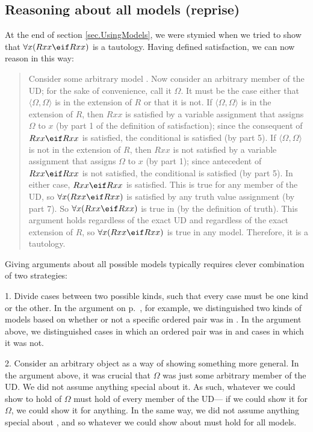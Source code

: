 \subsection{Reasoning about all models (reprise)}
At the end of section \ref{sec.UsingModels}, we were stymied when we tried to show that $\forall x(Rxx\eif Rxx)$ is a tautology. Having defined satisfaction, we can now reason in this way:
\begin{quote}
Consider some arbitrary model . Now consider an arbitrary member of the UD; for the sake of convenience, call it $\Omega$. It must be the case either that $\langle\Omega,\Omega\rangle$ is in the extension of $R$ or that it is not. If $\langle\Omega,\Omega\rangle$ is in the extension of $R$, then $Rxx$ is satisfied by a variable assignment that assigns $\Omega$ to $x$ (by part 1 of the definition of  {satisfaction}); since the consequent of $Rxx\eif Rxx$ is satisfied, the conditional is satisfied (by part 5). If $\langle\Omega,\Omega\rangle$ is not in the extension of $R$, then $Rxx$ is not satisfied by a variable assignment that assigns $\Omega$ to $x$ (by part 1); since antecedent of $Rxx\eif Rxx$ is not satisfied, the conditional is satisfied (by part 5). In either case, $Rxx\eif Rxx$ is satisfied. This is true for any member of the UD, so $\forall x(Rxx \eif Rxx)$ is satisfied by any truth value assignment (by part 7). So $\forall x(Rxx \eif Rxx)$ is true in  (by the definition of {truth}). This argument holds regardless of the exact UD and regardless of the exact extension of $R$, so $\forall x(Rxx \eif Rxx)$ is true in any model. Therefore, it is a tautology.
\end{quote}

Giving arguments about all possible models typically requires clever combination of two strategies:

1. Divide cases between two possible kinds, such that every case must be one kind or the other.  In the argument on p.~\pageref{allmodels1}, for example, we distinguished two kinds of models based on whether or not a specific ordered pair was in . In the argument above, we distinguished cases in which an ordered pair was in  and cases in which it was not.

2. Consider an arbitrary object as a way of showing something more general. In the argument above, it was crucial that $\Omega$ was just some arbitrary member of the UD. We did not assume anything special about it. As such, whatever we could show to hold of $\Omega$ must hold of every member of the UD--- if we could show it for $\Omega$, we could show it for anything. In the same way, we did not assume anything special about , and so whatever we could show about  must hold for all models.

